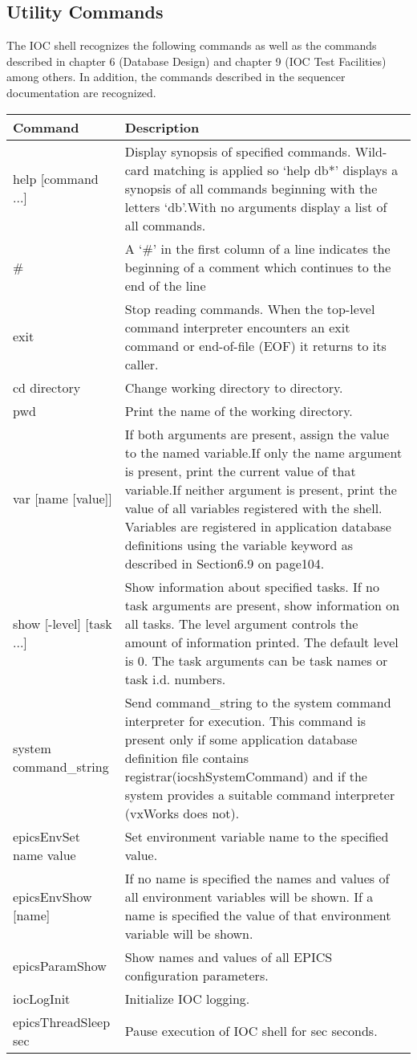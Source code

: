 \subsection{Utility Commands}

The IOC shell recognizes the following commands as well as the commands described in chapter 6 (Database Design) and 
chapter 9 (IOC Test Facilities) among others.  In addition, the commands described in the sequencer documentation are 
recognized.
\begin{center}\begin{longtable}{p{1.59082in}p{5.21418in}}
Command & Description\\
\hline
help [command ...] & Display synopsis of specified commands.  Wild-card matching is applied so `help db*' displays a synopsis of all commands beginning with the letters `db'.With no arguments display a list of all commands.\\
\# & A `\#' in the first column of a line indicates the beginning of a comment which continues to the end of the line\\
exit & Stop reading commands. When the top-level command interpreter encounters an exit command or end-of-file (EOF) it returns to its caller.\\
cd directory & Change working directory to directory.\\
pwd & Print the name of the working directory.\\
var [name [value]] & If both arguments are present, assign the value to the named variable.If only the name argument is present, print the current value of that variable.If neither argument is present, print the value of all variables registered with the shell.  Variables are registered in application database definitions using the variable keyword as described in Section6.9 on page104.\\
show [-level] [task ...] & Show information about specified tasks.  If no task arguments are present, show information on all tasks.  The level argument controls the amount of information printed.  The default level is 0.  The task arguments can be task names or task i.d. numbers.\\
system command\_string & Send command\_string to the system command interpreter for execution.  This command is present only if some application database definition file contains registrar(iocshSystemCommand) and if the system provides a suitable command interpreter (vxWorks does not).\\
epicsEnvSet name value & Set environment variable name to the specified value.\\
epicsEnvShow  [name] & If no name is specified the names and values of all environment variables will be shown. If a name is specified the value of that environment variable will be shown.\\
epicsParamShow & Show names and values of all EPICS configuration parameters.\\
iocLogInit & Initialize IOC logging.\\
epicsThreadSleep sec & Pause execution of IOC shell for sec seconds.
\end{longtable}\end{center}

